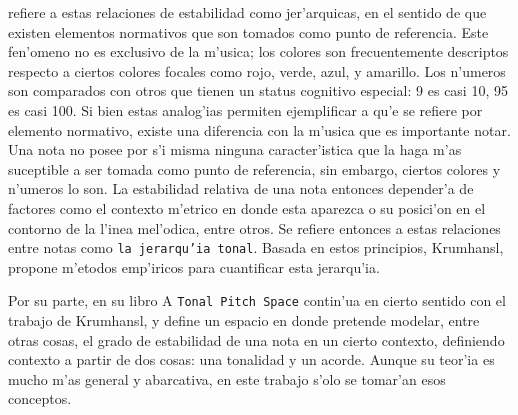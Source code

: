 \cite{Krumhansl90} refiere a estas relaciones de estabilidad como jer'arquicas, en el sentido de que existen elementos normativos que son tomados 
como punto de referencia. Este fen'omeno no es exclusivo de la m'usica; los colores son frecuentemente descriptos respecto a ciertos colores 
focales como rojo, verde, azul, y amarillo. Los n'umeros son comparados con otros que tienen un status cognitivo especial: 9 es casi 10, 95 es casi 100. 
Si bien estas analog'ias permiten ejemplificar a qu'e se refiere por elemento normativo, existe una diferencia con la m'usica que es importante notar. 
Una nota no posee por s'i misma ninguna caracter'istica que la haga m'as suceptible a ser tomada como punto de referencia, sin embargo, ciertos
colores y n'umeros lo son. La estabilidad relativa de una nota entonces 
depender'a de factores como el contexto m'etrico en donde esta aparezca o su posici'on en el contorno de la l'inea mel'odica, entre otros. 
Se refiere entonces a estas relaciones entre notas como \texttt{la jerarqu'ia tonal}. Basada en estos principios, Krumhansl, propone m'etodos 
emp'iricos para cuantificar esta jerarqu'ia.



Por su parte, \cite{Lerdahl2001} en su libro A \texttt{Tonal Pitch Space} contin'ua en cierto sentido con el trabajo de Krumhansl, y define un espacio en donde pretende 
modelar, entre otras cosas, el grado de estabilidad de una nota en un cierto contexto, definiendo contexto a partir de dos cosas: una tonalidad y un acorde. 
Aunque su teor'ia es mucho m'as general y abarcativa, en este trabajo s'olo se tomar'an esos conceptos.

